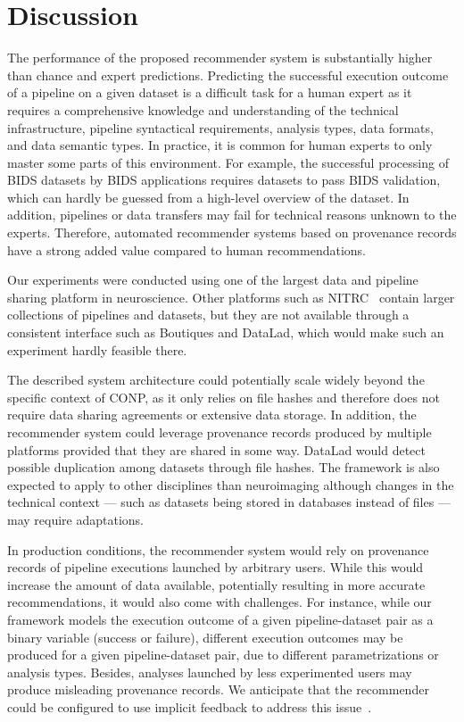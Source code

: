 \section{Discussion}


The performance of the proposed recommender system is substantially higher
than chance and expert predictions. Predicting the successful execution
outcome of a pipeline on a given dataset is a difficult task for a human expert as it requires a comprehensive knowledge and understanding of the technical infrastructure, pipeline syntactical requirements, analysis types, data formats, and data semantic types. In practice, it is common for human experts to only master some parts of this environment. For example,
the successful processing of BIDS datasets by BIDS applications requires
datasets to pass BIDS validation, which can hardly be guessed from a
high-level overview of the dataset. 
In addition, pipelines or data
transfers may fail for technical reasons unknown to the experts. Therefore, automated
recommender systems based on provenance records have a strong added value
compared to human recommendations. 

Our experiments were conducted using one of the largest data and pipeline
sharing platform in neuroscience. Other platforms such as
NITRC~\cite{kennedy2016nitrc} contain larger collections of
pipelines and datasets, but they are not available through a consistent
interface such as Boutiques and DataLad, which would make
such an experiment hardly feasible there.

The described system architecture could potentially scale widely beyond the specific
context of CONP, as it only relies on file hashes and therefore does not
require data sharing agreements or extensive data storage. In addition, the
recommender system could leverage provenance records produced by multiple
platforms provided that they are shared in some way.
DataLad would detect possible duplication among datasets through file hashes. 
The framework is also expected to apply to other disciplines than neuroimaging
although changes in the technical context --- such as datasets being stored in 
databases instead of files --- may require adaptations.

In production conditions, the recommender system would rely on provenance
records of pipeline executions launched by arbitrary users. While this would increase
the amount of data available, potentially resulting in more accurate
recommendations, it would also come with challenges. For instance, while
our framework models the execution outcome of a given pipeline-dataset pair
as a binary variable (success or failure), different execution outcomes may
be produced for a given pipeline-dataset pair, due to different
parametrizations or analysis types. Besides, analyses launched by less
experimented users may produce misleading provenance records. We anticipate
that the recommender could be configured to use implicit feedback to address 
this issue~\cite{hu2008collaborative}.

